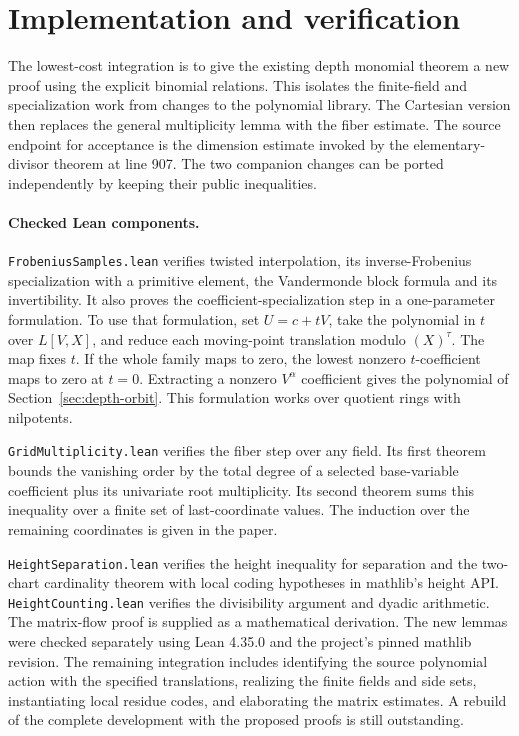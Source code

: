 \documentclass[11pt,letterpaper]{article}
\begin{document}
\section{Implementation and verification}
The lowest-cost integration is to give the existing depth monomial theorem a new proof using the explicit binomial relations. This isolates the finite-field and specialization work from changes to the polynomial library. The Cartesian version then replaces the general multiplicity lemma with the fiber estimate. The source endpoint for acceptance is the dimension estimate invoked by the elementary-divisor theorem at line 907. The two companion changes can be ported independently by keeping their public inequalities.
\paragraph{Checked Lean components.}
\texttt{FrobeniusSamples.lean} verifies twisted interpolation, its inverse-Frobenius specialization with a primitive element, the Vandermonde block formula and its invertibility. It also proves the coefficient-specialization step in a one-parameter formulation. To use that formulation, set $U=c+tV$, take the polynomial in $t$ over $L[V,X]$, and reduce each moving-point translation modulo $(X)^\tau$. The map fixes $t$. If the whole family maps to zero, the lowest nonzero $t$-coefficient maps to zero at $t=0$. Extracting a nonzero $V^\alpha$ coefficient gives the polynomial of Section~\ref{sec:depth-orbit}. This formulation works over quotient rings with nilpotents.
\par
\texttt{GridMultiplicity.lean} verifies the fiber step over any field. Its first theorem bounds the vanishing order by the total degree of a selected base-variable coefficient plus its univariate root multiplicity. Its second theorem sums this inequality over a finite set of last-coordinate values. The induction over the remaining coordinates is given in the paper.
\par
\texttt{HeightSeparation.lean} verifies the height inequality for separation and the two-chart cardinality theorem with local coding hypotheses in mathlib's height API. \texttt{HeightCounting.lean} verifies the divisibility argument and dyadic arithmetic. The matrix-flow proof is supplied as a mathematical derivation. The new lemmas were checked separately using Lean 4.35.0 and the project's pinned mathlib revision. The remaining integration includes identifying the source polynomial action with the specified translations, realizing the finite fields and side sets, instantiating local residue codes, and elaborating the matrix estimates. A rebuild of the complete development with the proposed proofs is still outstanding.
\end{document}
